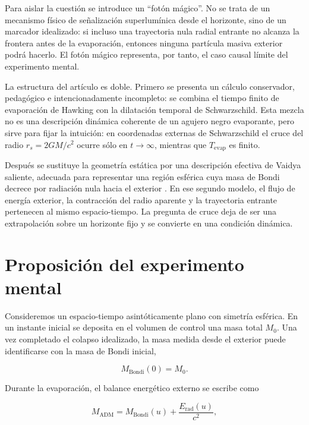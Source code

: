 \documentclass[
aps,
prd,
reprint,
superscriptaddress,
nofootinbib,
amsmath,
amssymb
]{revtex4-2}
\begin{document}
Para aislar la cuestión se introduce un ``fotón mágico''. No se trata de un mecanismo físico de señalización superlumínica desde el horizonte, sino de un marcador idealizado: si incluso una trayectoria nula radial entrante no alcanza la frontera antes de la evaporación, entonces ninguna partícula masiva exterior podrá hacerlo. El fotón mágico representa, por tanto, el caso causal límite del experimento mental.

La estructura del artículo es doble. Primero se presenta un cálculo conservador, pedagógico e intencionadamente incompleto: se combina el tiempo finito de evaporación de Hawking con la dilatación temporal de Schwarzschild. Esta mezcla no es una descripción dinámica coherente de un agujero negro evaporante, pero sirve para fijar la intuición: en coordenadas externas de Schwarzschild el cruce del radio $r_s=2GM/c^2$ ocurre sólo en $t\to\infty$, mientras que $T_{\mathrm{evap}}$ es finito.

Después se sustituye la geometría estática por una descripción efectiva de Vaidya saliente, adecuada para representar una región esférica cuya masa de Bondi decrece por radiación nula hacia el exterior \cite{Vaidya1951,Poisson2004}. En ese segundo modelo, el flujo de energía exterior, la contracción del radio aparente y la trayectoria entrante pertenecen al mismo espacio-tiempo. La pregunta de cruce deja de ser una extrapolación sobre un horizonte fijo y se convierte en una condición dinámica.

\section{Proposición del experimento mental}

Consideremos un espacio-tiempo asintóticamente plano con simetría esférica. En un instante inicial se deposita en el volumen de control una masa total $M_0$. Una vez completado el colapso idealizado, la masa medida desde el exterior puede identificarse con la masa de Bondi inicial,

\begin{equation}
M_{\mathrm{Bondi}}(0)=M_0.
\end{equation}

Durante la evaporación, el balance energético externo se escribe como

\begin{equation}
M_{\mathrm{ADM}}=
M_{\mathrm{Bondi}}(u)
+
\frac{E_{\mathrm{rad}}(u)}{c^2},
\label{eqADMBondiBalance}
\end{equation}
\end{document}
